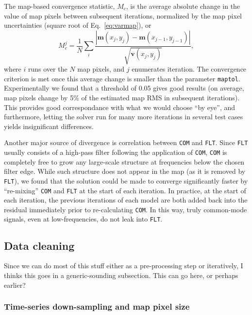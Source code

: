 \documentclass[useAMS,usenatbib,nofootinbib]{mn2e}
\newcommand{\model}[1]{\texttt{#1}}
\begin{document}
The map-based convergence statistic, $M_c$, is the average absolute
change in the value of map pixels between subsequent iterations,
normalized by the map pixel uncertainties (square root of
Eq.~\ref{eq:varmap}), or
%
\begin{equation}
M^j_c = \frac{1}{N} \sum_i \frac{| \mathbf{m}(x_j,y_j) -
  \mathbf{m}(x_{j-1},y_{j-1}) |} {\sqrt{\mathbf{v}(x_j,y_j)}} ,
\end{equation}
%
where $i$ runs over the $N$ map pixels, and $j$ enumerates
iteration. The convergence criterion is met once this average change
is smaller than the parameter \texttt{maptol}. Experimentally we found
that a threshold of 0.05 gives good results (on average, map pixels
change by 5\% of the estimated map RMS in subsequent iterations).
This provides good correspondance with what we would choose ``by
eye'', and furthermore, letting the solver run for many more
iterations in several test cases yields insignificant differences.

Another major source of divergence is correlation between \model{COM}
and \model{FLT}. Since \model{FLT} usually consists of a high-pass
filter following the application of \model{COM}, \model{COM} is
completely free to grow any large-scale structure at frequencies below
the chosen filter edge. While such structure does not appear in the
map (as it is removed by \model{FLT}), we found that the solution
could be made to converge significantly faster by ``re-mixing''
\model{COM} and \model{FLT} at the start of each iteration. In
practice, at the start of each iteration, the previous iterations of
each model are both added back into the residual immediately prior to
re-calculating \model{COM}. In this way, truly common-mode signals,
even at low-frequencies, do not leak into \model{FLT}.

\subsection{Data cleaning}

Since we can do most of this stuff either as a pre-processing step or
iteratively, I thinks this goes in a generic-sounding subsection. This
can go here, or perhaps earlier?

\subsubsection{Time-series down-sampling and map pixel size}
\label{sec:downsamp}
\end{document}
